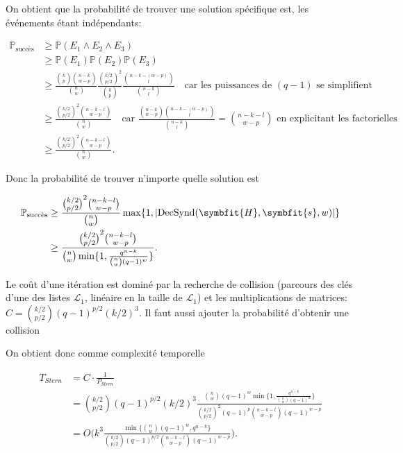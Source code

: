 \documentclass{scrartcl}[a4paper,9pt,headings=small,footinclude=false]
\theoremstyle{definition}
\theoremstyle{remark}
\begin{document}
On obtient que la probabilité de trouver une solution spécifique est, les événements étant indépendants:

\begin{align*}
\mathbb{P}_{\text{succès}} &\geq \mathbb{P}(E_1 \wedge E_2 \wedge E_3)\\
&\geq \mathbb{P}(E_1) \mathbb{P}(E_2) \mathbb{P}(E_3) \\
&\geq \frac{\binom{k}{p}\binom{n-k}{w-p}}{\binom{n}{w}} \frac{\binom{k/2}{p/2}^2}{\binom{k}{p}} \frac{\binom{n-k-(w-p)}{l}}{\binom{n-k}{l}} \quad \text{car les puissances de } (q-1) \text{ se simplifient}\\
&\geq \frac{\binom{k/2}{p/2}^2\binom{n-k-l}{w-p}}{\binom{n}{w}} \quad \text{car } \frac{\binom{n-k}{w-p}\binom{n-k-(w-p)}{l}}{\binom{n-k}{l}} = \binom{n-k-l}{w-p} \text{ en explicitant les factorielles}\\
&\geq \frac{\binom{k/2}{p/2}^2\binom{n-k-l}{w-p}}{\binom{n}{w}}.
\end{align*}

Donc la probabilité de trouver n'importe quelle solution est

\begin{align*}
\mathbb{P}_{\text{succès}} &\geq \frac{\binom{k/2}{p/2}^2\binom{n-k-l}{w-p}}{\binom{n}{w}}\max \{ 1, |\text{DecSynd}(\symbfit{H},\symbfit{s},w)| \}\\
&\geq \frac{\binom{k/2}{p/2}^2\binom{n-k-l}{w-p}}{\binom{n}{w} \min \{ 1, \frac{q^{n-k}}{\binom{n}{w}(q-1)^w} \}}.
\end{align*}

Le coût d'une itération est dominé par la recherche de collision (parcours des clés d'une des listes $\mathcal{L}_1$, linéaire en la taille de $\mathcal{L}_1$) et les multiplications de matrices: $C=\binom{k/2}{p/2}(q-1)^{p/2}(k/2)^3$.
Il faut aussi ajouter la probabilité d'obtenir une collision

On obtient donc comme complexité temporelle

\begin{align*}
	T_{Stern} &= C \cdot \frac{1}{P_{Stern}}\\
	&= \binom{k/2}{p/2}(q-1)^{p/2}(k/2)^3 \frac{\binom{n}{w}(q-1)^w \min \{ 1, \frac{q^{n-k}}{\binom{n}{w}(q-1)^w} \} }{\binom{k/2}{p/2}^2 (q-1)^p \binom{n-k-l}{w-p}(q-1)^{w-p}}\\
	&= O\Big(k^3 \frac{\min \{ \binom{n}{w}(q-1)^w, q^{n-k}\} }{\binom{k/2}{p/2} (q-1)^{p/2} \binom{n-k-l}{w-p}(q-1)^{w-p}}\Big).
\end{align*}
\end{document}
